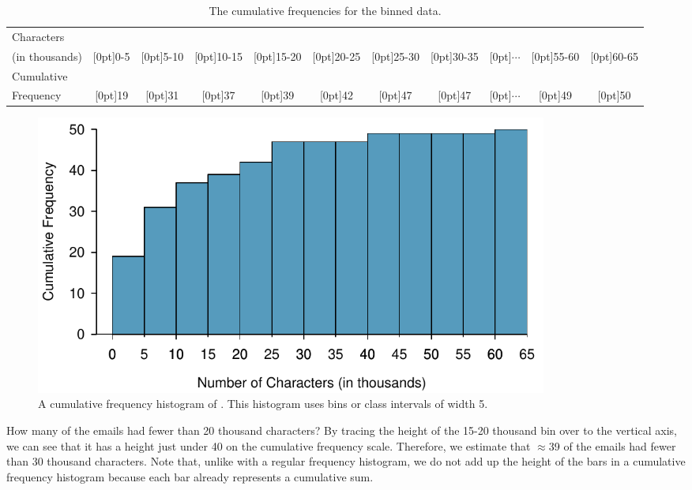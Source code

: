 \begin{table}[ht]
\centering\small
\begin{tabular}{l ccc ccc ccc c}
  \hline
Characters & \\
(in thousands) & \raisebox{1.5ex}[0pt]{0-5} & \raisebox{1.5ex}[0pt]{5-10} & \raisebox{1.5ex}[0pt]{10-15} & \raisebox{1.5ex}[0pt]{15-20} & \raisebox{1.5ex}[0pt]{20-25} & \raisebox{1.5ex}[0pt]{25-30} &  \raisebox{1.5ex}[0pt]{30-35} &\raisebox{1.5ex}[0pt]{$\cdots$} & \raisebox{1.5ex}[0pt]{55-60} & \raisebox{1.5ex}[0pt]{60-65} \\
  \hline
Cumulative &\\
Frequency &  \raisebox{1.5ex}[0pt]{19} & \raisebox{1.5ex}[0pt]{31} & \raisebox{1.5ex}[0pt]{37} & \raisebox{1.5ex}[0pt]{39} & \raisebox{1.5ex}[0pt]{42} & \raisebox{1.5ex}[0pt]{47} & \raisebox{1.5ex}[0pt]{47} & \raisebox{1.5ex}[0pt]{$\cdots$} & \raisebox{1.5ex}[0pt]{49} & \raisebox{1.5ex}[0pt]{50} \\
  \hline
\end{tabular}
\caption{The cumulative frequencies for the binned  data.}
\label{binnedNumCharTableCumulative}
\end{table}

\begin{figure}[bth]
   \centering
   \includegraphics[width=0.82\textwidth]{ch_summarizing_data/figures/email50NumCharHist/email50NumCharCumulativeFreqHist}
   \caption{A cumulative frequency histogram of . This histogram uses bins or class intervals of width 5.}
   \label{email50NumCharCumulativeFreqHist}
\end{figure}

\begin{example}{How many of the emails had fewer than 20 thousand characters?}
By tracing the height of the 15-20 thousand bin over to the vertical axis, we can see that it has a height just under 40 on the cumulative frequency scale. Therefore, we estimate that $\approx$39 of the emails had fewer than 30 thousand characters. Note that, unlike with a regular frequency histogram, we do not add up the height of the bars in a cumulative frequency histogram because each bar already represents a cumulative sum.
\end{example}

